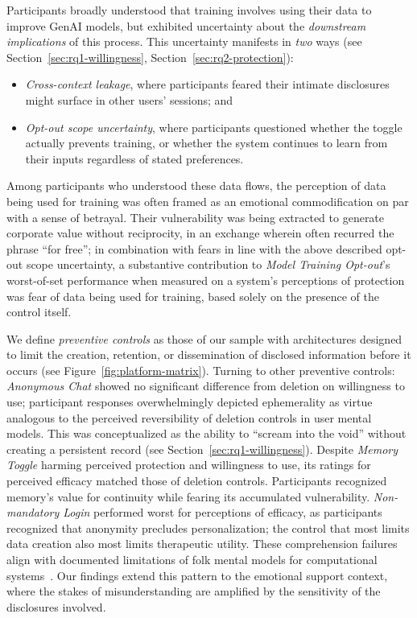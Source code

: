 \documentclass[letterpaper,twocolumn,10pt]{article}
\begin{document}
Participants broadly understood that training involves using their data to improve GenAI models, but exhibited uncertainty about the \textit{downstream implications} of this process. This uncertainty manifests in \textit{two} ways (see Section~\ref{sec:rq1-willingness}, Section~\ref{sec:rq2-protection}): 
\begin{itemize}
    \item \textit{Cross-context leakage}, where participants feared their intimate disclosures might surface in other users' sessions; and
    \item \textit{Opt-out scope uncertainty}, where participants questioned whether the toggle actually prevents training, or whether the system continues to learn from their inputs regardless of stated preferences.
\end{itemize}

Among participants who understood these data flows, the perception of data being used for training was often framed as an emotional commodification on par with a sense of betrayal. Their vulnerability was being extracted to generate corporate value without reciprocity, in an exchange wherein often recurred the phrase ``for free''; in combination with fears in line with the above described opt-out scope uncertainty, a substantive contribution to \emph{Model Training Opt-out}'s worst-of-set performance when measured on a system's perceptions of protection was fear of data being used for training, based solely on the presence of the control itself.

 We define \textit{preventive controls} as those of our sample with architectures designed to limit the creation, retention, or dissemination of disclosed information before it occurs (see Figure~\ref{fig:platform-matrix}). Turning to other preventive controls: \emph{Anonymous Chat} showed no significant difference from deletion on willingness to use; participant responses overwhelmingly depicted ephemerality as virtue analogous to the perceived reversibility of deletion controls in user mental models. This was conceptualized as the ability to ``scream into the void'' without creating a persistent record (see Section~\ref{sec:rq1-willingness}). Despite \emph{Memory Toggle} harming perceived protection and willingness to use, its ratings for perceived efficacy matched those of deletion controls. Participants recognized memory's value for continuity while fearing its accumulated vulnerability. \emph{Non-mandatory Login} performed worst for perceptions of efficacy, as participants recognized that anonymity precludes personalization; the control that most limits data creation also most limits therapeutic utility. These comprehension failures align with documented limitations of folk mental models for computational systems~\cite{kang2015data, yao2017folk, eslami2016folk}. Our findings extend this pattern to the emotional support context, where the stakes of misunderstanding are amplified by the sensitivity of the disclosures involved.
\end{document}
